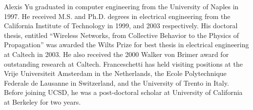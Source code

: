 \documentclass[journal]{IEEEtran}
\begin{document}
\vspace{-1in}
\begin{IEEEbiography} {Alexis Yu} graduated in computer engineering from the University of Naples in 1997. He received M.S. and Ph.D. degrees in electrical engineering from the California Institute of Technology in 1999, and 2003 respectively. His doctoral thesis, entitled ``Wireless Networks, from Collective Behavior to the Physics of Propagation'' was awarded the Wilts Prize for best thesis in electrical engineering at Caltech in 2003. He also received the 2000 Walker von Brimer award for outstanding research at Caltech. Franceschetti has held visiting positions at the Vrije Universiteit Amsterdam in the Netherlands, the Ecole Polytechnique Federale de Lausanne in Switzerland, and the University of Trento in Italy. Before joining UCSD, he was a post-doctoral scholar at University of California at Berkeley for two years. 
\end{IEEEbiography}
\end{document}
